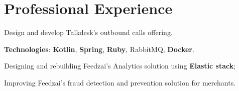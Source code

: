 \documentclass[letterpaper]{deedy-resume} %
\begin{document}
\begin{minipage}[t]{0.64\textwidth} %


\section{Professional Experience}
\vspace{0.5mm}

\vspace{3.5mm}
\begin{tightitemize}
	\item Design and develop Talkdesk's outbound calls offering.
\end{tightitemize}

\vspace{0.5mm}

\textbf{Technologies}: \textbf{Kotlin}, \textbf{Spring}, \textbf{Ruby}, RabbitMQ, \textbf{Docker}.


\vspace{4.0mm}



\vspace{2.0mm}
\begin{tightitemize}
	\item Designing and rebuilding Feedzai's Analytics solution using \textbf{Elastic stack};
	\item Improving Feedzai's fraud detection and prevention solution for merchants.
\end{tightitemize}


\end{minipage}
\end{document}
